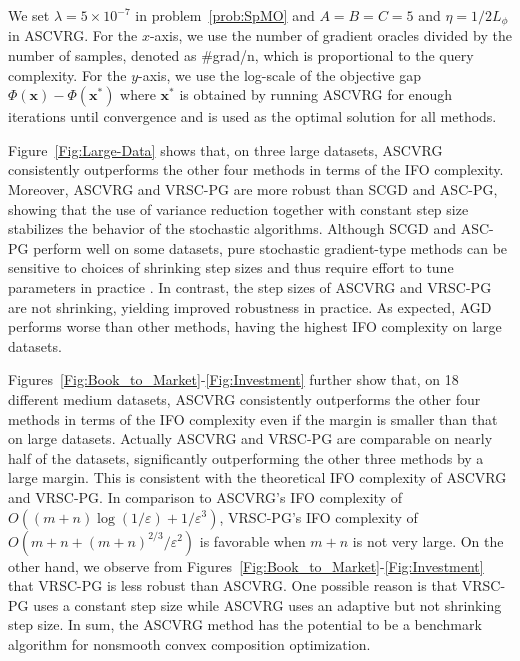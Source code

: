 \documentclass[11pt]{article}
\newcommand{\x}{\mathbf x}
\begin{document}
We set $\lambda=5\times10^{-7}$ in problem~\eqref{prob:SpMO} and $A=B=C=5$ and $\eta=1/2L_\phi$ in ASCVRG. For the $x$-axis, we use the number of gradient oracles divided by the number of samples, denoted as \#grad/n, which is proportional to the query complexity. For the $y$-axis, we use the log-scale of the objective gap $\Phi(\x)-\Phi(\x^*)$ where $\x^*$ is obtained by running ASCVRG for enough iterations until convergence and is used as the optimal solution for all methods.

Figure~\ref{Fig:Large-Data} shows that, on three large datasets, ASCVRG consistently outperforms the other four methods in terms of the IFO complexity. Moreover, ASCVRG and VRSC-PG are more robust than SCGD and ASC-PG, showing that the use of variance reduction together with constant step size stabilizes the behavior of the stochastic algorithms. Although SCGD and ASC-PG perform well on some datasets, pure stochastic gradient-type methods can be sensitive to choices of shrinking step sizes and thus require effort to tune parameters in practice \cite{Berahas-2017-Investigation}. In contrast, the step sizes of ASCVRG and VRSC-PG are not shrinking, yielding improved robustness in practice. As expected, AGD performs worse than other methods, having the highest IFO complexity on large datasets. 

Figures~\ref{Fig:Book_to_Market}-\ref{Fig:Investment} further show that, on 18 different medium datasets, ASCVRG consistently outperforms the other four methods in terms of the IFO complexity even if the margin is smaller than that on large datasets. Actually ASCVRG and VRSC-PG are comparable on nearly half of the datasets, significantly outperforming the other three methods by a large margin. This is consistent with the theoretical IFO complexity of ASCVRG and VRSC-PG. In comparison to ASCVRG's IFO complexity of $O\left((m+n)\log(1/\varepsilon)+1/\varepsilon^3\right)$, VRSC-PG's IFO complexity of $O(m+n+(m+n)^{2/3}/\varepsilon^2)$ is favorable when $m+n$ is not very large. On the other hand, we observe from Figures~\ref{Fig:Book_to_Market}-\ref{Fig:Investment} that VRSC-PG is less robust than ASCVRG. One possible reason is that VRSC-PG uses a constant step size while ASCVRG uses an adaptive but not shrinking step size. In sum, the ASCVRG method has the potential to be a benchmark algorithm for nonsmooth convex composition optimization. 
\end{document}
